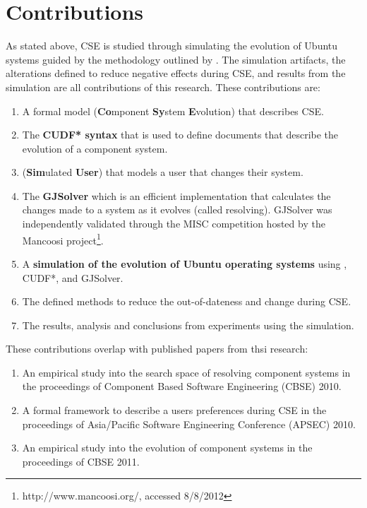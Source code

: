 \section{Contributions}
As stated above, CSE is studied through simulating the evolution of Ubuntu systems guided by the methodology outlined by \cite{Law2005}.
The simulation artifacts, the alterations defined to reduce negative effects during CSE, 
and results from the simulation are all contributions of this research. 
These contributions are:
\begin{enumerate}
  \item A formal model \textbf{\modelname} (\textbf{Co}mponent \textbf{Sy}stem \textbf{E}volution) that describes CSE. 
  \item The \textbf{CUDF* syntax} that is used to define documents that describe the evolution of a component system.
  \item \textbf{\usermodel} (\textbf{Sim}ulated \textbf{User}) that models a user that changes their system.
  \item The \textbf{GJSolver} which is an efficient implementation that calculates the changes made to a system as it evolves (called resolving).
	GJSolver was independently validated through the MISC competition hosted by the Mancoosi project\footnote{http://www.mancoosi.org/, accessed 8/8/2012}. 
  \item A \textbf{simulation of the evolution of Ubuntu operating systems} using \modelname, CUDF*, \usermodel and GJSolver.
  \item The defined methods to reduce the out-of-dateness and change during CSE. 
  \item The results, analysis and conclusions from experiments using the simulation.
\end{enumerate}

These contributions overlap with published papers from thsi research:
\begin{enumerate}
  \item An empirical study into the search space of resolving component systems \citep{Jenson2010} in the proceedings of Component Based Software Engineering (CBSE) 2010.
  \item A formal framework to describe a users preferences during CSE \citep{Jenson2010a} in the proceedings of Asia/Pacific Software Engineering Conference (APSEC) 2010.
  \item An empirical study into the evolution of component systems \citep{jenson2011} in the proceedings of CBSE 2011.
\end{enumerate}

